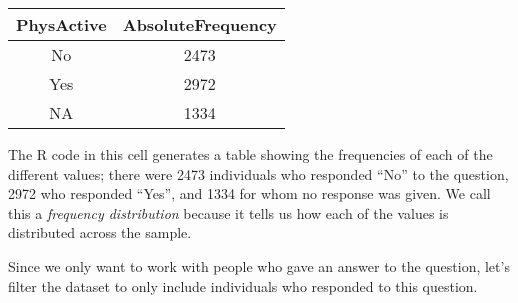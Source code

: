 \documentclass[]{book}
\newenvironment{Shaded}{\begin{snugshade}}{\end{snugshade}}
\newcommand{\KeywordTok}[1]{\textcolor[rgb]{0.13,0.29,0.53}{\textbf{#1}}}
\newcommand{\DataTypeTok}[1]{\textcolor[rgb]{0.13,0.29,0.53}{#1}}
\newcommand{\StringTok}[1]{\textcolor[rgb]{0.31,0.60,0.02}{#1}}
\newcommand{\CommentTok}[1]{\textcolor[rgb]{0.56,0.35,0.01}{\textit{#1}}}
\newcommand{\OperatorTok}[1]{\textcolor[rgb]{0.81,0.36,0.00}{\textbf{#1}}}
\newcommand{\NormalTok}[1]{#1}
\theoremstyle{definition}
\theoremstyle{definition}
\theoremstyle{definition}
\theoremstyle{remark}
\begin{document}
\begin{longtable}[]{@{}cc@{}}
\toprule
\begin{minipage}[b]{0.17\columnwidth}\centering\strut
PhysActive\strut
\end{minipage} & \begin{minipage}[b]{0.25\columnwidth}\centering\strut
AbsoluteFrequency\strut
\end{minipage}\tabularnewline
\midrule
\endhead
\begin{minipage}[t]{0.17\columnwidth}\centering\strut
No\strut
\end{minipage} & \begin{minipage}[t]{0.25\columnwidth}\centering\strut
2473\strut
\end{minipage}\tabularnewline
\begin{minipage}[t]{0.17\columnwidth}\centering\strut
Yes\strut
\end{minipage} & \begin{minipage}[t]{0.25\columnwidth}\centering\strut
2972\strut
\end{minipage}\tabularnewline
\begin{minipage}[t]{0.17\columnwidth}\centering\strut
NA\strut
\end{minipage} & \begin{minipage}[t]{0.25\columnwidth}\centering\strut
1334\strut
\end{minipage}\tabularnewline
\bottomrule
\end{longtable}

The R code in this cell generates a table showing the frequencies of
each of the different values; there were 2473 individuals who responded
``No'' to the question, 2972 who responded ``Yes'', and 1334 for whom no
response was given. We call this a \emph{frequency distribution} because
it tells us how each of the values is distributed across the sample.

Since we only want to work with people who gave an answer to the
question, let's filter the dataset to only include individuals who
responded to this question.

\begin{Shaded}
\end{Shaded}
\end{document}
